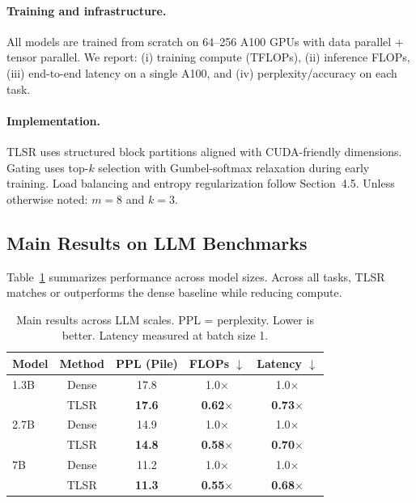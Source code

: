 \documentclass{article}
\theoremstyle{plain}
\theoremstyle{definition}
\theoremstyle{remark}
\begin{document}
\paragraph{Training and infrastructure.}
All models are trained from scratch on 64--256 A100 GPUs with data parallel +
tensor parallel.
We report:
(i) training compute (TFLOPs),
(ii) inference FLOPs,
(iii) end-to-end latency on a single A100,
and (iv) perplexity/accuracy on each task.

\paragraph{Implementation.}
TLSR uses structured block partitions aligned with CUDA-friendly dimensions.
Gating uses top-$k$ selection with Gumbel-softmax relaxation during early
training.
Load balancing and entropy regularization follow Section~4.5.
Unless otherwise noted: $m=8$ and $k=3$.

\subsection{Main Results on LLM Benchmarks}

Table~\ref{tab:main-results} summarizes performance across model sizes.
Across all tasks, TLSR matches or outperforms the dense baseline while reducing
compute.

\begin{table}[t]
\centering
\caption{Main results across LLM scales.
PPL = perplexity. Lower is better.
Latency measured at batch size 1.}
\label{tab:main-results}
\begin{tabular}{lcccc}
\toprule
Model & Method & PPL (Pile) & FLOPs $\downarrow$ & Latency $\downarrow$ \\
\midrule
1.3B & Dense & 17.8 & 1.0$\times$ & 1.0$\times$ \\
     & TLSR & \textbf{17.6} & \textbf{0.62$\times$} & \textbf{0.73$\times$} \\
\midrule
2.7B & Dense & 14.9 & 1.0$\times$ & 1.0$\times$ \\
     & TLSR & \textbf{14.8} & \textbf{0.58$\times$} & \textbf{0.70$\times$} \\
\midrule
7B   & Dense & 11.2 & 1.0$\times$ & 1.0$\times$ \\
     & TLSR & \textbf{11.3} & \textbf{0.55$\times$} & \textbf{0.68$\times$} \\
\bottomrule
\end{tabular}
\end{table}
\end{document}
